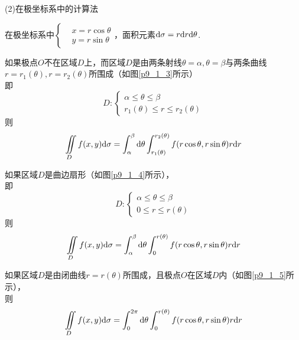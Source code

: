 (2)在极坐标系中的计算法

在极坐标系中$\left\{\begin{aligned} & x=r\cos\theta \\ & y=r\sin\theta \end{aligned}\right.$，面积元素$\mathrm{d}\sigma=r\mathrm{d} r\mathrm{d}\theta$.

如果极点$O$不在区域$D$上，而区域$D$是由两条射线$\theta=\alpha,\theta=\beta$与两条曲线$r=r_1(\theta),r=r_2(\theta)$所围成（如图\ref{p9_1_3}所示）\\
即
\begin{equation*}
    D:
    \begin{cases}
        \alpha \leq \theta \leq \beta \\
        r_1(\theta) \leq r \leq r_2(\theta)
    \end{cases}
\end{equation*}
则
\begin{equation*}
    \iint \limits_{D} f(x,y)\mathrm{d}\sigma=\int_{\alpha}^{\beta}\mathrm{d}\theta \int_{r_1(\theta)}^{r_2(\theta)} f(r\cos\theta,r\sin\theta)r\mathrm{d} r
\end{equation*}

如果区域$D$是曲边扇形（如图\ref{p9_1_4}所示），\\
即
\begin{equation*}
    D:
    \begin{cases}
        \alpha \leq \theta \leq \beta \\
        0 \leq r \leq r(\theta)
    \end{cases}
\end{equation*}
则
\begin{equation*}
    \iint \limits_{D} f(x,y)\mathrm{d}\sigma=\int_{\alpha}^{\beta}\mathrm{d}\theta \int_{0}^{r(\theta)} f(r\cos\theta,r\sin\theta)r\mathrm{d} r
\end{equation*}

如果区域$D$是由闭曲线$r=r(\theta)$所围成，且极点$O$在区域$D$内（如图\ref{p9_1_5}所示），\\
则
\begin{equation*}
    \iint \limits_{D} f(x,y)\mathrm{d}\sigma=\int_{0}^{2\pi}\mathrm{d}\theta \int_{0}^{r(\theta)} f(r\cos\theta,r\sin\theta)r\mathrm{d} r
\end{equation*}

